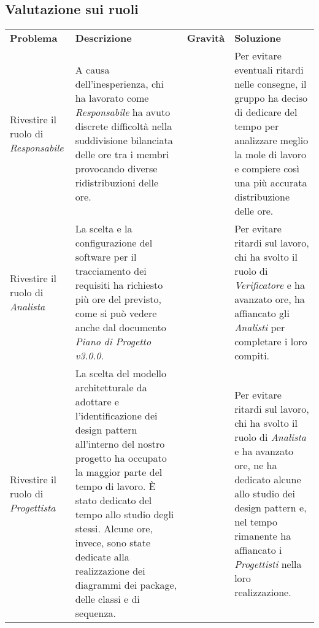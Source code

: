 \subsection{Valutazione sui ruoli}
\begin{table}[H]
	\renewcommand{\arraystretch}{1.5}
	\caption{Tabella delle problematiche relative ai ruoli}	
	\begin{longtable}{ >{\centering}p{} >{}p{}
			>{\centering}p{} >{}p{}}
			
		\rowcolorhead
		\textbf{\color{white}Problema} 
		& \centering\textbf{\color{white}Descrizione} 
		& \centering\textbf{\color{white}Gravità}
		& \textbf{\color{white}Soluzione} 
		\tabularnewline %
		
		Rivestire il ruolo di \textit{Responsabile} &
		A causa dell'inesperienza, chi ha lavorato come \textit{Responsabile} ha avuto discrete
		difficoltà nella suddivisione bilanciata delle ore tra i membri provocando 
		diverse ridistribuzioni delle ore. &
		3 &
		Per evitare eventuali ritardi nelle consegne, il gruppo ha deciso di dedicare 
		del tempo per analizzare meglio la mole di lavoro e compiere così una più
		accurata distribuzione delle ore.
						
		\tabularnewline 
		Rivestire il ruolo di \textit{Analista} &
		La scelta e la configurazione del software per il tracciamento dei requisiti
		ha richiesto più ore del previsto, come si può vedere anche dal documento
		\textit{Piano di Progetto v3.0.0}. &
		2 &
		Per evitare ritardi sul lavoro, chi ha svolto il ruolo di \textit{Verificatore}
		e ha avanzato ore, ha affiancato gli \textit{Analisti} per completare 
		i loro compiti.
		
		\tabularnewline 
		Rivestire il ruolo di \textit{Progettista} &
		La scelta del modello architetturale da adottare e l'identificazione dei design pattern all'interno del nostro progetto ha occupato la maggior parte del tempo di lavoro. \`E stato dedicato del tempo allo studio degli stessi. Alcune ore, invece, sono state dedicate alla realizzazione dei diagrammi dei package, delle classi e di sequenza.&
		2 &
		Per evitare ritardi sul lavoro, chi ha svolto il ruolo di \textit{Analista}
		e ha avanzato ore, ne ha dedicato alcune allo studio dei design pattern e, nel tempo rimanente ha affiancato i \textit{Progettisti} nella loro realizzazione.
			
	\end{longtable}
	
\end{table}
\newpage
